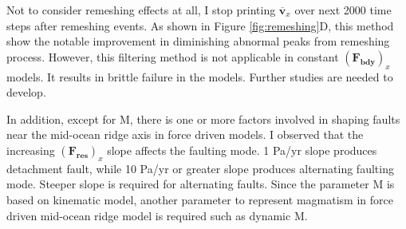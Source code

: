 \documentclass[letterpaper,12pt,notitle]{memphisthesis}                     %
\begin{document}
Not to consider remeshing effects at all, I stop printing $\overline{\boldsymbol{v}}_{x}$ over next 2000 time steps after remeshing events. As shown in Figure \ref{fig:remeshing}D, this method show the notable improvement in diminishing abnormal peaks from remeshing process. However, this filtering method is not applicable in constant $(\boldsymbol{F_{bdy}})_x$ models. It results in brittle failure in the models. Further studies are needed to develop.

In addition, except for M, there is one or more factors involved in shaping faults near the mid-ocean ridge axis in force driven models. I observed that the increasing $(\boldsymbol{F_{res}})_x$ slope affects the faulting mode. 1 Pa/yr slope produces detachment fault, while 10 Pa/yr or greater slope produces alternating faulting mode. Steeper slope is required for alternating faults. Since the parameter M is based on kinematic model, another parameter to represent magmatism in force driven mid-ocean ridge model is required such as dynamic M.



\end{document}
